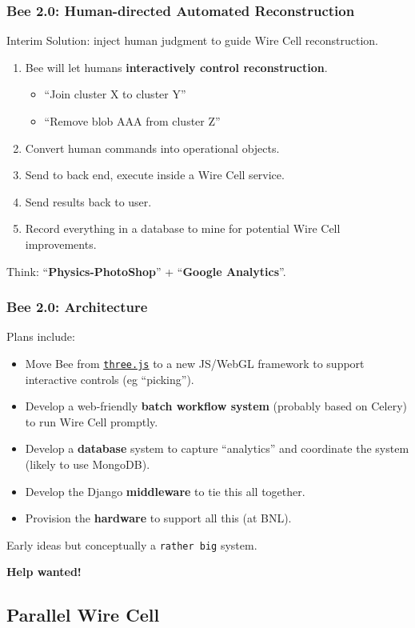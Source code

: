 \documentclass[xcolor=dvipsnames]{beamer}
\begin{document}
\begin{frame}
  \frametitle{Bee 2.0: Human-directed Automated Reconstruction}
  Interim Solution: inject human judgment to guide Wire Cell reconstruction.
  \begin{enumerate}
  \item Bee will let humans \textbf{interactively control reconstruction}.
    \begin{itemize}
    \item ``Join cluster X to cluster Y''
    \item ``Remove blob AAA from cluster Z''
    \end{itemize}
  \item Convert human commands into operational objects.
  \item Send to back end, execute inside a Wire Cell service.
  \item Send results back to user.
  \item Record everything in a database to mine for potential Wire
    Cell improvements.
  \end{enumerate}
  Think: ``\textbf{Physics-PhotoShop}'' + ``\textbf{Google Analytics}''.

\end{frame}

\begin{frame}
  \frametitle{Bee 2.0: Architecture}
  Plans include:
  \begin{itemize}
  \item Move Bee from \href{http://threejs.org/}{\texttt{three.js}} to a new JS/WebGL framework to support interactive controls (eg ``picking'').
  \item Develop a web-friendly \textbf{batch workflow system} (probably based on Celery) to run Wire Cell promptly.
  \item Develop a \textbf{database} system to capture ``analytics'' and coordinate the system (likely to use MongoDB).
  \item Develop the Django \textbf{middleware} to tie this all together.
  \item Provision the \textbf{hardware} to support all this (at BNL).
  \end{itemize}

  Early ideas but conceptually a \texttt{rather big} system.

  \textbf{Help wanted!}

\end{frame}

\subsection{Parallel Wire Cell}
\end{document}
